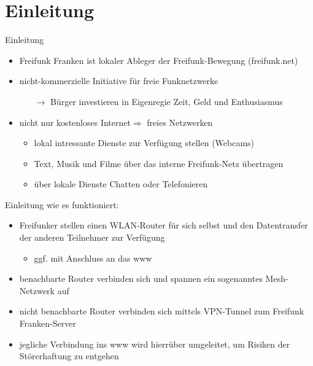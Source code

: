 \section{Einleitung}

\begin{frame}{Einleitung}
	\begin{itemize}
		\item<1-> Freifunk Franken ist lokaler Ableger der Freifunk-Bewegung (freifunk.net)
		\item<1-> nicht-kommerzielle Initiative für freie Funknetzwerke\\
							\begin{itemize}
								\item[$\rightarrow$] Bürger investieren in Eigenregie Zeit, Geld und Enthusiasmus
							\end{itemize}
 		\item<1-> nicht nur \glqq kostenloses Internet\grqq $\Rightarrow$ \glqq freies Netzwerken\grqq\\
							\begin{itemize}
								\item<2-> lokal intressante Dienste zur Verfügung stellen (Webcams)
								\item<2-> Text, Musik und Filme über das interne Freifunk-Netz übertragen
								\item<2-> über lokale Dienste Chatten oder Telefonieren
							\end{itemize}
	\end{itemize}
\end{frame}

\begin{frame}{Einleitung}
	wie es funktioniert:
	\begin{itemize}
		\item<1-> Freifunker stellen einen WLAN-Router für sich selbst und den Datentransfer der anderen Teilnehmer zur Verfügung
							\begin{itemize}
								\item<1-> ggf. mit Anschluss an das www
							\end{itemize}
		\item<1-> benachbarte Router verbinden sich und spannen ein sogenanntes Mesh-Netzwerk auf
		\item<1-> nicht benachbarte Router verbinden sich mittels VPN-Tunnel zum Freifunk Franken-Server
		\item<1-> jegliche Verbindung ins www wird hierrüber umgeleitet, um Risiken der Störerhaftung zu entgehen
	\end{itemize}
\end{frame}

